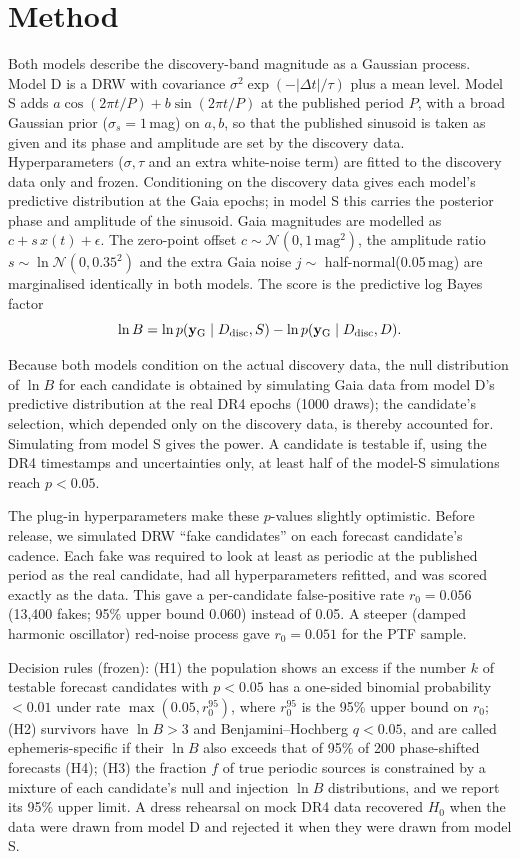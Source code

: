 \documentclass[RNAAS]{aastex631}
\begin{document}
\section{Method}

Both models describe the discovery-band magnitude as a Gaussian process. Model D is a DRW
with covariance $\sigma^2\exp(-|\Delta t|/\tau)$ plus a mean level. Model S adds
$a\cos(2\pi t/P)+b\sin(2\pi t/P)$ at the published period $P$, with a broad Gaussian prior
($\sigma_s=1$\,mag) on $a,b$, so that the published sinusoid is taken as given and its phase
and amplitude are set by the discovery data. Hyperparameters ($\sigma,\tau$ and an extra
white-noise term) are fitted to the discovery data only and frozen. Conditioning on the
discovery data gives each model's predictive distribution at the Gaia epochs; in model S
this carries the posterior phase and amplitude of the sinusoid. Gaia magnitudes are
modelled as $c+s\,x(t)+\epsilon$. The zero-point offset $c\sim\mathcal{N}(0,1\,\mathrm{mag}^2)$,
the amplitude ratio $s\sim\ln\mathcal{N}(0,0.35^2)$ and the extra Gaia noise
$j\sim$ half-normal(0.05\,mag) are marginalised identically in both models. The score is the
predictive log Bayes factor
\begin{equation}
\ln B=\ln p(\mathbf{y}_{\rm G}\mid D_{\rm disc},S)-\ln p(\mathbf{y}_{\rm G}\mid D_{\rm disc},D).
\end{equation}

Because both models condition on the actual discovery data, the null distribution of
$\ln B$ for each candidate is obtained by simulating Gaia data from model D's predictive
distribution at the real DR4 epochs (1000 draws); the candidate's selection, which depended
only on the discovery data, is thereby accounted for. Simulating from model S gives the power.
A candidate is testable if, using the DR4 timestamps and uncertainties only, at least half of
the model-S simulations reach $p<0.05$.

The plug-in hyperparameters make these $p$-values slightly optimistic. Before release, we
simulated DRW ``fake candidates'' on each forecast candidate's cadence. Each fake was required
to look at least as periodic at the published period as the real candidate, had all
hyperparameters refitted, and was scored exactly as the data. This gave a per-candidate
false-positive rate $r_0=0.056$ (13,400 fakes; 95\% upper bound 0.060) instead of 0.05. A steeper
(damped harmonic oscillator) red-noise process gave $r_0=0.051$ for the PTF sample.

Decision rules (frozen): (H1) the population shows an excess if the number $k$ of testable
forecast candidates with $p<0.05$ has a one-sided binomial probability $<0.01$ under rate
$\max(0.05,r_0^{95})$, where $r_0^{95}$ is the 95\% upper bound on $r_0$; (H2) survivors have
$\ln B>3$ and Benjamini--Hochberg $q<0.05$, and are called ephemeris-specific if their $\ln B$
also exceeds that of 95\% of 200 phase-shifted forecasts (H4); (H3) the fraction $f$ of true
periodic sources is constrained by a mixture of each candidate's null and injection $\ln B$
distributions, and we report its 95\% upper limit. A dress rehearsal on mock DR4 data recovered
$H_0$ when the data were drawn from model D and rejected it when they were drawn from model S.
\end{document}
